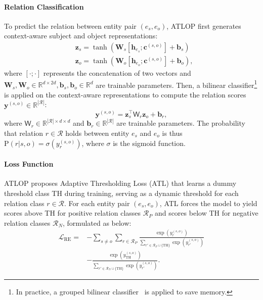 \documentclass[11pt]{article}
\newcommand{\setR}{\mathcal{R}}
\begin{document}
\paragraph{Relation Classification} To predict the relation between entity pair $(e_s, e_o)$, ATLOP first generates context-aware subject and object representations:
\begin{align}
    & \bm{z}_s = \tanh(\bm{W}_s[\bm{h}_{e_s};\bm{c}^{(s,o)}] + \bm{b}_s) \\
    & \bm{z}_o = \tanh(\bm{W}_o[\bm{h}_{e_o};\bm{c}^{(s,o)}] + \bm{b}_o), 
\end{align}
where $[\cdot;\cdot]$ represents the concatenation of two vectors and $\bm{W}_s, \bm{W}_o \in \mathbb{R}^{d \times 2d}, \bm{b}_s, \bm{b}_o \in \mathbb{R}^d$ are trainable parameters. 
Then, a bilinear classifier\footnote{In practice, a grouped bilinear classifier~\cite{Zheng2019LearningDB} is applied to save memory.} is applied on the context-aware representations to compute the relation scores $\bm{y}^{(s,o)} \in \mathbb{R}^{|\setR|}$:
\begin{equation}
    \bm{y}^{(s,o)} = \bm{z}_s^\top\mathsf{W}_r\bm{z}_o + \bm{b}_r,
\end{equation}
where $\mathsf{W}_r \in \mathbb{R}^{|\mathcal{R}| \times d\times d}$ and $\bm{b}_r \in \mathbb{R}^{|\mathcal{R}|}$ are trainable parameters.
The probability that relation $r\in \setR$ holds between entity $e_s$ and $e_o$ is thus $\mathrm{P}(r|s,o) = \sigma(y^{(s,o)}_r)$, where $\sigma$ is the sigmoid function.

\paragraph{Loss Function} ATLOP proposes Adaptive Thresholding Loss (ATL) that learns a dummy threshold class TH during training, serving as a dynamic threshold for each relation class $r\in\setR$.
For each entity pair $(e_s, e_o)$, ATL forces the model to yield scores above TH for positive relation classes $\setR_P$ and scores below TH for negative relation classes $\setR_N$, formulated as below:
\begin{equation}
    \label{eq:atl}
    \begin{split}
    \mathcal{L}_{\mathrm{RE}} = & - \sum_{s \neq o}\sum_{r \in \setR_P} \frac{\exp(y^{(s,o)}_r)}{\sum_{r' \in \setR_P \cup \{\mathrm{TH}\}}\exp(y_{r'}^{(s,o)})}\\
    & - \frac{\exp(y^{(s,o)}_{\mathrm{TH}})}{\sum_{r' \in \setR_N \cup \{\mathrm{TH}\} }\exp(y_{r'}^{(s,o)})}.
    \end{split}
\end{equation}
\end{document}
